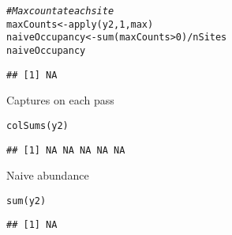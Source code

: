 \documentclass[color=usenames,dvipsnames]{beamer}\usepackage[]{graphicx}\usepackage[]{color}
\makeatletter
\newcommand{\hlnum}[1]{\textcolor[rgb]{0.69,0.494,0}{#1}}%
\newcommand{\hlcom}[1]{\textcolor[rgb]{0.514,0.506,0.514}{\textit{#1}}}%
\newcommand{\hlopt}[1]{\textcolor[rgb]{0,0,0}{#1}}%
\newcommand{\hlstd}[1]{\textcolor[rgb]{0,0,0}{#1}}%
\newcommand{\hlkwb}[1]{\textcolor[rgb]{0,0.341,0.682}{#1}}%
\newcommand{\hlkwd}[1]{\textcolor[rgb]{0.004,0.004,0.506}{#1}}%
\newenvironment{kframe}{%
 \def\at@end@of@kframe{}%
 \ifinner\ifhmode%
  \def\at@end@of@kframe{\end{minipage}}%
  \begin{minipage}{\columnwidth}%
 \fi\fi%
 \def\FrameCommand##1{\hskip\@totalleftmargin \hskip-\fboxsep
 \colorbox{shadecolor}{##1}\hskip-\fboxsep
     \hskip-\linewidth \hskip-\@totalleftmargin \hskip\columnwidth}%
 \MakeFramed {\advance\hsize-\width
   \@totalleftmargin\z@ \linewidth\hsize
   \@setminipage}}%
 {\par\unskip\endMakeFramed%
 \at@end@of@kframe}
\newenvironment{knitrout}{}{} %
\makeatother
\begin{document}
\begin{frame}[fragile]
\begin{columns}
\begin{column}{0.6\textwidth}
    \vspace{-6pt}
\begin{knitrout}\scriptsize
{}\color{fgcolor}\begin{kframe}
\begin{alltt}
\hlcom{# Max count at each site}
\hlstd{maxCounts} \hlkwb{<-} \hlkwd{apply}\hlstd{(y2,} \hlnum{1}\hlstd{, max)}
\hlstd{naiveOccupancy} \hlkwb{<-} \hlkwd{sum}\hlstd{(maxCounts}\hlopt{>}\hlnum{0}\hlstd{)}\hlopt{/}\hlstd{nSites}
\hlstd{naiveOccupancy}
\end{alltt}
\begin{verbatim}
## [1] NA
\end{verbatim}
\end{kframe}
\end{knitrout}
  \pause
  \vfill
  \small
  Captures on each pass
  \vspace{-6pt}
\begin{knitrout}\scriptsize
{}\color{fgcolor}\begin{kframe}
\begin{alltt}
\hlkwd{colSums}\hlstd{(y2)}
\end{alltt}
\begin{verbatim}
## [1] NA NA NA NA NA
\end{verbatim}
\end{kframe}
\end{knitrout}
  \pause
  \vfill
  Naive abundance
  \vspace{-6pt}
\begin{knitrout}\scriptsize
{}\color{fgcolor}\begin{kframe}
\begin{alltt}
\hlkwd{sum}\hlstd{(y2)}
\end{alltt}
\begin{verbatim}
## [1] NA
\end{verbatim}
\end{kframe}
\end{knitrout}

  \end{column}
  \end{columns}
\end{frame}









\end{document}
